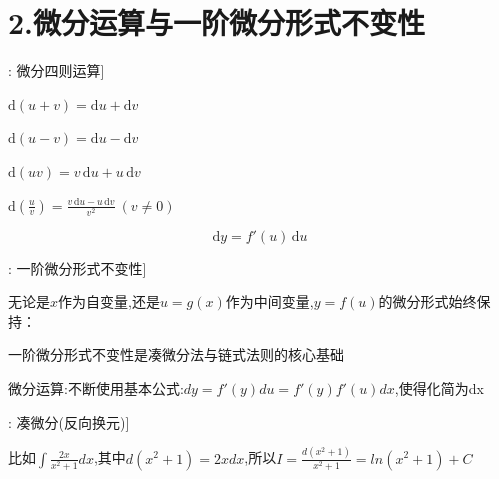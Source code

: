 \documentclass[11pt,a4paper,UTF8]{ctexart}
\begin{document}
\section{2.微分运算与一阶微分形式不变性}

\begin{thmbox}[原理[6]: 微分四则运算]

$\mathrm{d}(u + v) = \mathrm{d}u + \mathrm{d}v$

$\mathrm{d}(u - v) = \mathrm{d}u - \mathrm{d}v$

$\mathrm{d}(uv) = v\,\mathrm{d}u + u\,\mathrm{d}v$

$\mathrm{d}\left(\frac{u}{v}\right) = \frac{v\,\mathrm{d}u - u\,\mathrm{d}v}{v^2} \ (v \neq 0)$

\end{thmbox}

\begin{equation*}
\mathrm{d}y = f'(u)\,\mathrm{d}u
\end{equation*}
\begin{thmbox}[原理[7]: 一阶微分形式不变性]

无论是$x$作为自变量,还是$u=g(x)$作为中间变量,$y=f(u)$的微分形式始终保持：


  一阶微分形式不变性是凑微分法与链式法则的核心基础

  微分运算:不断使用基本公式:$dy = f'(y)du = f'(y)f'(u)dx$,使得化简为dx

\end{thmbox}
\begin{thmbox}[原理[8]: 凑微分(反向换元)]

比如$\int\frac{2x}{x^2+1}dx$,其中$d(x^2+1)=2xdx$,所以$I=\frac{d(x^2+1)}{x^2+1}=ln(x^2+1)+C$

\end{thmbox}
\end{document}
